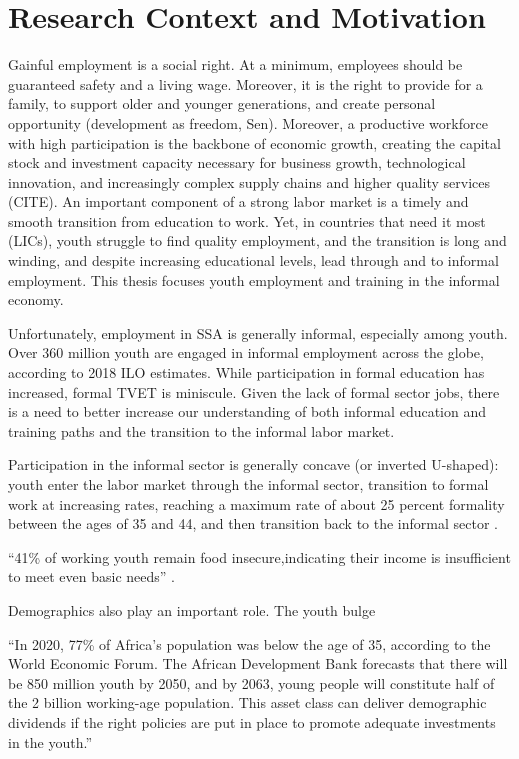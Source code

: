 \documentclass[
  a4paper, twoside, 12pt]{book}
\begin{document}
\hypertarget{research-context-and-motivation}{%
\section{Research Context and Motivation}\label{research-context-and-motivation}}

Gainful employment is a social right. At a minimum, employees should be guaranteed safety and a living wage. Moreover, it is the right to provide for a family, to support older and younger generations, and create personal opportunity (development as freedom, Sen). Moreover, a productive workforce with high participation is the backbone of economic growth, creating the capital stock and investment capacity necessary for business growth, technological innovation, and increasingly complex supply chains and higher quality services (CITE). An important component of a strong labor market is a timely and smooth transition from education to work. Yet, in countries that need it most (LICs), youth struggle to find quality employment, and the transition is long and winding, and despite increasing educational levels, lead through and to informal employment. This thesis focuses youth employment and training in the informal economy.

Unfortunately, employment in SSA is generally informal, especially among youth. Over 360 million youth are engaged in informal employment across the globe, according to 2018 ILO estimates. While participation in formal education has increased, formal TVET is miniscule. Given the lack of formal sector jobs, there is a need to better increase our understanding of both informal education and training paths and the transition to the informal labor market.

Participation in the informal sector is generally concave (or inverted U-shaped): youth enter the labor market through the informal sector, transition to formal work at increasing rates, reaching a maximum rate of about 25 percent formality between the ages of 35 and 44, and then transition back to the informal sector \autocite{chacaltana2019}.

``41\% of working youth remain food insecure,indicating their income is insufficient to meet even basic needs'' \autocite{africandevelopmentbank2016a}.

Demographics also play an important role. The youth bulge

``In 2020, 77\% of Africa's population was below the age of 35, according to the World Economic Forum. The African Development Bank forecasts that there will be 850 million youth by 2050, and by 2063, young people will constitute half of the 2 billion working-age population. This asset class can deliver demographic dividends if the right policies are put in place to promote adequate investments in the youth.''
\end{document}
